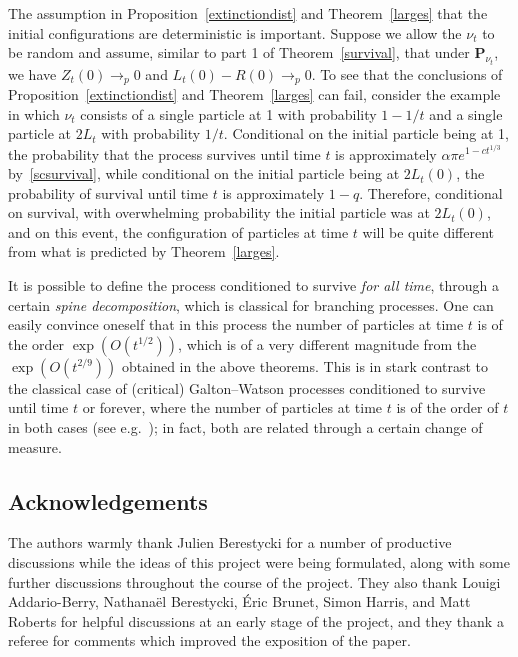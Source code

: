 \documentclass[AHL,Unicode,longabstracts,published]{cedram}
\renewcommand*\P{\mathbf{P}}
\newcommand{\1} {\mathds{1}}
\begin{document}
\begin{rema}
The assumption in Proposition~\ref{extinctiondist} and Theorem~\ref{larges} that the initial configurations are deterministic is important. Suppose we allow the $\nu_t$ to be random and assume, similar to part 1 of Theorem~\ref{survival}, that under $\P_{\nu_t}$, we have $Z_t(0) \rightarrow_p 0$ and $L_t(0) - R(0) \rightarrow_p 0$. To see that the conclusions of Proposition~\ref{extinctiondist} and Theorem~\ref{larges} can fail, consider the example in which $\nu_t$ consists of a single particle at 1 with probability $1 - 1/t$ and a single particle at $2L_t$ with probability $1/t$. Conditional on the initial particle being at 1, the probability that the process survives until time $t$ is approximately $\alpha \pi e^{1 - ct^{1/3}}$ by~\eqref{scsurvival}, while conditional on the initial particle being at $2L_t(0)$, the probability of survival until time $t$ is approximately $1 - q$. Therefore, conditional on survival, with overwhelming probability the initial particle was at $2L_t(0)$, and on this event, the configuration of particles at time $t$ will be quite different from what is predicted by Theorem~\ref{larges}.
\end{rema}

\begin{rema}
It is possible to define the process conditioned to survive \emph{for all time}, through a certain \emph{spine decomposition}, which is classical for branching processes. One can easily convince oneself that in this process the number of particles at time $t$ is of the order $\exp(O(t^{1/2}))$, which is of a very different magnitude from the $\exp(O(t^{2/9}))$ obtained in the above theorems. This is in stark contrast to the classical case of (critical) Galton--Watson processes conditioned to survive until time $t$ or forever, where the number of particles at time $t$ is of the order of $t$ in both cases (see e.g.~\cite{lpp}); in fact, both are related through a certain change of measure.
\end{rema}

\subsection*{Acknowledgements}
The authors warmly thank Julien Berestycki for a number of productive discussions while the ideas of this project were being formulated, along with some further discussions throughout the course of the project. They also thank Louigi Addario-Berry, Nathana\"el Berestycki, Éric Brunet, Simon Harris, and Matt Roberts for helpful discussions at an early stage of the project, and they thank a referee for comments which improved the exposition of the paper. 
\end{document}
